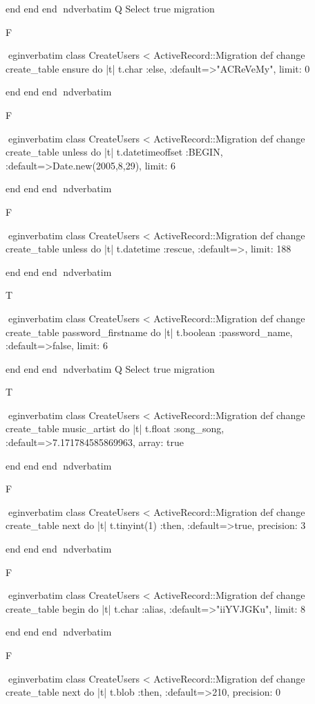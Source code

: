     end 
  end 
end
nd{verbatim}
Q
 Select true migration

F

egin{verbatim}
 class CreateUsers < ActiveRecord::Migration 
  def change 
    create_table ensure do |t| 
      t.char :else, :default=>"ACReVeMy", limit: 0
    
    end 
  end 
end
nd{verbatim}

F

egin{verbatim}
 class CreateUsers < ActiveRecord::Migration 
  def change 
    create_table unless do |t| 
      t.datetimeoffset :BEGIN, :default=>Date.new(2005,8,29), limit: 6
    
    end 
  end 
end
nd{verbatim}

F

egin{verbatim}
 class CreateUsers < ActiveRecord::Migration 
  def change 
    create_table unless do |t| 
      t.datetime :rescue, :default=>, limit: 188
    
    end 
  end 
end
nd{verbatim}

T

egin{verbatim}
 class CreateUsers < ActiveRecord::Migration 
  def change 
    create_table password_firstname do |t| 
      t.boolean :password_name, :default=>false, limit: 6
    
    end 
  end 
end
nd{verbatim}
Q
 Select true migration

T

egin{verbatim}
 class CreateUsers < ActiveRecord::Migration 
  def change 
    create_table music_artist do |t| 
      t.float :song_song, :default=>7.171784585869963, array: true
    
    end 
  end 
end
nd{verbatim}

F

egin{verbatim}
 class CreateUsers < ActiveRecord::Migration 
  def change 
    create_table next do |t| 
      t.tinyint(1) :then, :default=>true, precision: 3
    
    end 
  end 
end
nd{verbatim}

F

egin{verbatim}
 class CreateUsers < ActiveRecord::Migration 
  def change 
    create_table begin do |t| 
      t.char :alias, :default=>"iiYVJGKu", limit: 8
    
    end 
  end 
end
nd{verbatim}

F

egin{verbatim}
 class CreateUsers < ActiveRecord::Migration 
  def change 
    create_table next do |t| 
      t.blob :then, :default=>210, precision: 0
    

